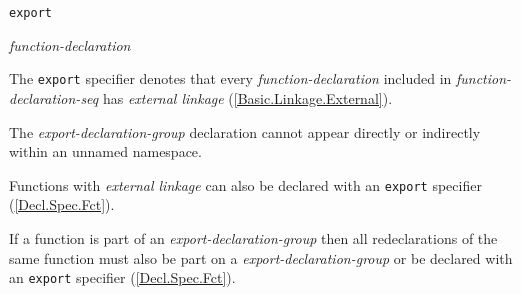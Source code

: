 \begin{grammar}
  \br
  \texttt{export} \terminal{\{}  \terminal{\}}\br

  \br
  \textit{function-declaration} 
\end{grammar}

\p The \texttt{export} specifier denotes that every \textit{function-declaration} included in \textit{function-declaration-seq} has \textit{external linkage} (\ref{Basic.Linkage.External}).

\p The \textit{export-declaration-group} declaration cannot appear directly or indirectly within an unnamed namespace.

\p Functions with \textit{external linkage} can also be declared with an \texttt{export} specifier (\ref{Decl.Spec.Fct}).

\p If a function is part of an \textit{export-declaration-group} then all redeclarations of the same function must also be part on a \textit{export-declaration-group} or be declared with an \texttt{export} specifier (\ref{Decl.Spec.Fct}).
